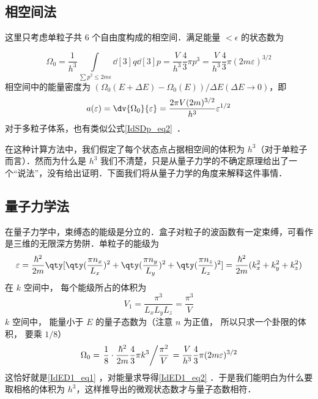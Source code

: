 
\begin{issues}
\issueDraft
\end{issues}

\subsection{相空间法}
这里只考虑单粒子共 $6$ 个自由度构成的相空间．满足能量 $<\epsilon$ 的状态数为

\begin{equation}\label{IdED1_eq1}
\Omega_0 = \frac{1}{h^3}\int\limits_{\sum {p^2}  \leqslant 2m\epsilon} \dd[3]{q} \dd[3]{p}
 = \frac{V}{h^3}\frac43 \pi {p^3}
 = \frac{V}{h^3}\frac43 \pi (2m\varepsilon)^{3/2}
\end{equation}
相空间中的能量密度为 $(\Omega_0(E+\Delta E)-\Omega_0(E))/\Delta E(\Delta E\rightarrow 0)$，即
\begin{equation}\label{IdED1_eq2}
a(\varepsilon) = \dv{\Omega_0}{\varepsilon} = \frac{2\pi V(2m)^{3/2}}{h^3} \varepsilon^{1/2}
\end{equation}
对于多粒子体系，也有类似公式\autoref{IdSDp_eq2}~．

在这种计算方法中，我们假定了每个状态点占据相空间的体积为 $h^3$（对于单粒子而言）．然而为什么是 $h^3$ 我们不清楚，只是从量子力学的不确定原理给出了一个“说法”，没有给出证明．下面我们将从量子力学的角度来解释这件事情．
\subsection{量子力学法}
在量子力学中，束缚态的能级是分立的．盒子对粒子的波函数有一定束缚，可看作是三维的无限深方势阱．单粒子的能级为
\begin{equation}
\varepsilon = \frac{\hbar ^2}{2m} \qty[\qty(\frac{\pi n_x}{L_x})^2 + \qty(\frac{\pi n_y}{L_y})^2 + \qty(\frac{\pi n_z}{L_z})^2] = \frac{\hbar ^2}{2m} (k_x^2 + k_y^2 + k_z^2)
\end{equation}
在 $k$ 空间中， 每个能级所占的体积为
\begin{equation}
V_1 = \frac{\pi^3}{L_x L_y L_z} = \frac{\pi^3}{V}
\end{equation}
$k$ 空间中， 能量小于 $E$ 的量子态数为（注意 $n$ 为正值， 所以只求一个卦限的体积， 要乘 $1/8$）
\begin{equation}
\Omega_0 = \left. \frac18\cdot \frac{\hbar^2}{2m}\frac43 \pi k^3 \middle/ \frac{\pi^2}{V} \right. = \frac{V}{h^3}\frac43 \pi(2m\varepsilon)^{3/2}
\end{equation}
这恰好就是\autoref{IdED1_eq1} ，对能量求导得\autoref{IdED1_eq2} ．于是我们能明白为什么要取相格的体积为 $h^3$，这样推导出的微观状态数才与量子态数相符．